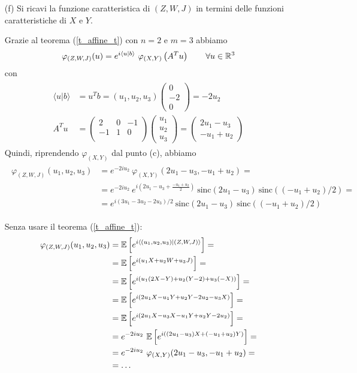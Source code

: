 \begin{itemize}
\item [(f)] Si ricavi la funzione caratteristica di $(Z,W,J)$ in termini delle funzioni caratteristiche di $X$ e $Y$.

Grazie al teorema (\ref{t_affine_t}) con $n=2$ e $m=3$ abbiamo
\[
\varphi_{(Z,W,J)}(u)=e^{i\langle u|b\rangle} \ \varphi_{(X,Y)}\left(A^T  u\right)\qquad\forall u\in\mathbb{R}^3
\]
con
\begin{gather*}
\begin{aligned}
\langle u|b\rangle&=u^Tb=(u_1,u_2,u_3)\begin{pmatrix}
0 \\-2
 \\0
\end{pmatrix}=-2u_2 \\
A^T  u&=\begin{pmatrix}
2 &  0&  -1\\
-1 & 1 & 0 \\
\end{pmatrix}\begin{pmatrix}
u_1 \\
u_2 \\u_3
\end{pmatrix}=\begin{pmatrix}
2u_1-u_3 \\-u_1+u_2
\end{pmatrix}
\end{aligned}
\end{gather*}
Quindi, riprendendo $\varphi_{(X,Y)}$ dal punto (c), abbiamo
\begin{gather*}
\begin{aligned}
\varphi_{(Z,W,J)}(u_1,u_2,u_3)&=e^{-2iu_2}\ \varphi_{(X,Y)}(2u_1-u_3,-u_1+u_2)=\\
&=e^{-2iu_2}\ e^{i\left(2u_1-u_3+\frac{-u_1+u_2}{2}  \right)}\ \text{sinc}(2u_1-u_3)\ \text{sinc}\left((-u_1+u_2)/2\right)=\\
&=e^{i(3u_1-3u_2-2u_3)/2}\ \text{sinc}(2u_1-u_3)\ \text{sinc}\left((-u_1+u_2)/2\right)
\end{aligned}
\end{gather*}

\begin{oss}
Senza usare il teorema (\ref{t_affine_t}):
\begin{gather*}
\begin{aligned}
\varphi_{(Z,W,J)}(u_1,u_2,u_3)&=\mathbb{E}\left[e^{i\langle(u_1,u_2,u_3)|(Z,W,J)  \rangle}   \right]=\\
&=\mathbb{E}\left[e^{i(u_1X+u_2W+u_3J)}   \right]=\\
&=\mathbb{E}\left[e^{i(u_1(2X-Y)+u_2(Y-2)+u_3(-X))}   \right]=\\
&=\mathbb{E}\left[e^{i(2u_1X-u_1Y+u_2Y-2u_2-u_3X)}   \right]=\\
&=\mathbb{E}\left[e^{i(2u_1X-u_3X-u_1Y+u_2Y-2u_2)}   \right]=\\
&=e^{-2iu_2}\ \mathbb{E}\left[e^{i((2u_1-u_3)X+(-u_1+u_2)Y)}   \right]=\\
&=e^{-2iu_2}\ \varphi_{(X,Y)}(2u_1-u_3,-u_1+u_2)=\\
&=\dots
\end{aligned}
\end{gather*}
\end{oss}


\end{itemize}
